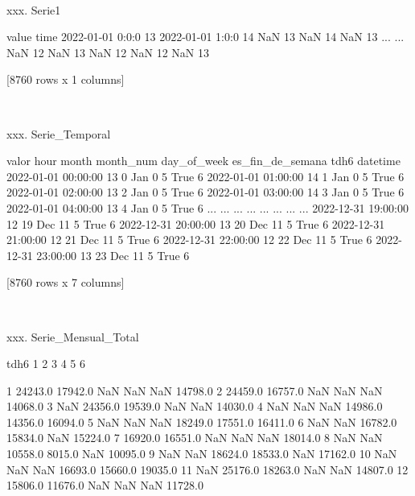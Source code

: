 \documentclass[a4paper,10pt]{article}
\begin{document}
\begin{Form}
\

xxx. Serie1

                  value
time                   
2022-01-01 0:0:0     13
2022-01-01 1:0:0     14
NaN                  13
NaN                  14
NaN                  13
...                 ...
NaN                  12
NaN                  13
NaN                  12
NaN                  12
NaN                  13

[8760 rows x 1 columns] \

\

xxx. Serie_Temporal

                     valor  hour month  month_num  day_of_week  es_fin_de_semana  tdh6
datetime                                                                              
2022-01-01 00:00:00     13     0   Jan          0            5              True     6
2022-01-01 01:00:00     14     1   Jan          0            5              True     6
2022-01-01 02:00:00     13     2   Jan          0            5              True     6
2022-01-01 03:00:00     14     3   Jan          0            5              True     6
2022-01-01 04:00:00     13     4   Jan          0            5              True     6
...                    ...   ...   ...        ...          ...               ...   ...
2022-12-31 19:00:00     12    19   Dec         11            5              True     6
2022-12-31 20:00:00     13    20   Dec         11            5              True     6
2022-12-31 21:00:00     12    21   Dec         11            5              True     6
2022-12-31 22:00:00     12    22   Dec         11            5              True     6
2022-12-31 23:00:00     13    23   Dec         11            5              True     6

[8760 rows x 7 columns] \

\

xxx. Serie_Mensual_Total

tdh6        1        2        3        4        5        6
                                                          
1     24243.0  17942.0      NaN      NaN      NaN  14798.0
2     24459.0  16757.0      NaN      NaN      NaN  14068.0
3         NaN  24356.0  19539.0      NaN      NaN  14030.0
4         NaN      NaN      NaN  14986.0  14356.0  16094.0
5         NaN      NaN      NaN  18249.0  17551.0  16411.0
6         NaN      NaN  16782.0  15834.0      NaN  15224.0
7     16920.0  16551.0      NaN      NaN      NaN  18014.0
8         NaN      NaN  10558.0   8015.0      NaN  10095.0
9         NaN      NaN  18624.0  18533.0      NaN  17162.0
10        NaN      NaN      NaN  16693.0  15660.0  19035.0
11        NaN  25176.0  18263.0      NaN      NaN  14807.0
12    15806.0  11676.0      NaN      NaN      NaN  11728.0 \


\end{Form}
\end{document}

